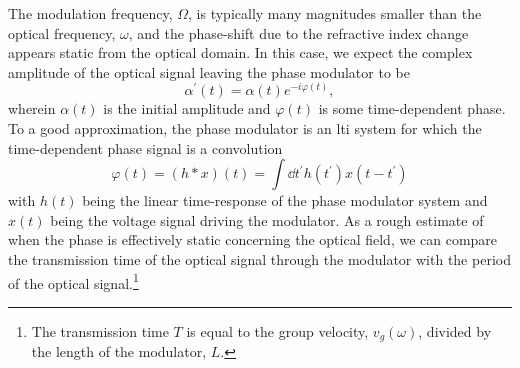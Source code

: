 The modulation frequency, $\Omega$, is typically many magnitudes smaller than the optical frequency, $\omega$, and the phase-shift due to the refractive index change appears static from the optical domain.
In this case, we expect the complex amplitude of the optical signal leaving the phase modulator to be
\begin{equation}
	\alpha^\prime(t)
	=
	\alpha(t)
	e^{-i\varphi(t)}
	,
\end{equation}
wherein $\alpha(t)$ is the initial amplitude and $\varphi(t)$ is some time-dependent phase.
To a good approximation, the phase modulator is an \gls{lti} system for which the time-dependent phase signal is a convolution
\begin{equation}
	\varphi(t)
	=
	\left(h*x\right)(t)
	=
	\int\dd{t^\prime}
	h(t^\prime)
	x(t-t^\prime)
\end{equation}
with $h(t)$ being the linear time-response of the phase modulator system and $x(t)$ being the voltage signal driving the modulator.
As a rough estimate of when the phase is effectively static concerning the optical field, we can compare the transmission time of the optical signal through the modulator with the period of the optical signal.\footnote{The transmission time $T$ is equal to the group velocity, $v_g(\omega)$, divided by the length of the modulator, $L$.}









